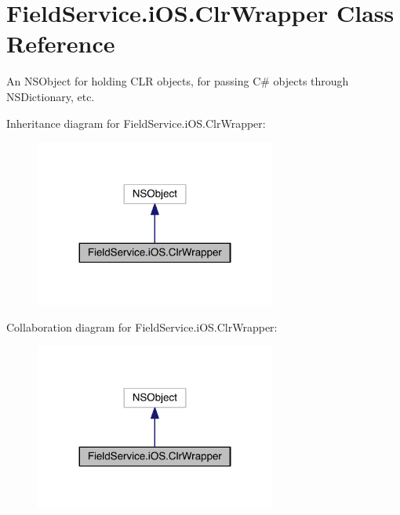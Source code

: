 \hypertarget{class_field_service_1_1i_o_s_1_1_clr_wrapper}{\section{Field\+Service.\+i\+O\+S.\+Clr\+Wrapper Class Reference}
\label{class_field_service_1_1i_o_s_1_1_clr_wrapper}
}


An N\+S\+Object for holding C\+L\+R objects, for passing C\# objects through N\+S\+Dictionary, etc.  




Inheritance diagram for Field\+Service.\+i\+O\+S.\+Clr\+Wrapper\+:
\nopagebreak
\begin{figure}[H]
\begin{center}
\leavevmode
\includegraphics[width=224pt]{class_field_service_1_1i_o_s_1_1_clr_wrapper__inherit__graph}
\end{center}
\end{figure}


Collaboration diagram for Field\+Service.\+i\+O\+S.\+Clr\+Wrapper\+:
\nopagebreak
\begin{figure}[H]
\begin{center}
\leavevmode
\includegraphics[width=224pt]{class_field_service_1_1i_o_s_1_1_clr_wrapper__coll__graph}
\end{center}
\end{figure}
